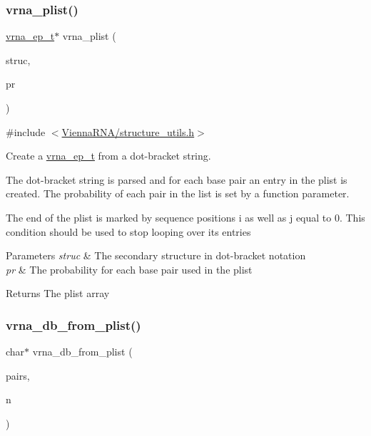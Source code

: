 \subsubsection{\texorpdfstring{vrna\+\_\+plist()}{vrna\_plist()}}
{\footnotesize\ttfamily \mbox{\hyperlink{group__struct__utils_gab9ac98ab55ded9fb90043b024b915aca}{vrna\+\_\+ep\+\_\+t}}$\ast$ vrna\+\_\+plist (\begin{DoxyParamCaption}\item[{const char $\ast$}]{struc,  }\item[{float}]{pr }\end{DoxyParamCaption})}



{\ttfamily \#include $<$\mbox{\hyperlink{structure__utils_8h}{Vienna\+R\+N\+A/structure\+\_\+utils.\+h}}$>$}



Create a \mbox{\hyperlink{group__struct__utils_gab9ac98ab55ded9fb90043b024b915aca}{vrna\+\_\+ep\+\_\+t}} from a dot-\/bracket string. 

The dot-\/bracket string is parsed and for each base pair an entry in the plist is created. The probability of each pair in the list is set by a function parameter.

The end of the plist is marked by sequence positions i as well as j equal to 0. This condition should be used to stop looping over its entries


\begin{DoxyParams}{Parameters}
{\em struc} & The secondary structure in dot-\/bracket notation \\
\hline
{\em pr} & The probability for each base pair used in the plist \\
\hline
\end{DoxyParams}
\begin{DoxyReturn}{Returns}
The plist array 
\end{DoxyReturn}
\mbox{\label{group__struct__utils_ga6a51a36b9245d0bac868c5cd172b9611}} 
\subsubsection{\texorpdfstring{vrna\+\_\+db\+\_\+from\+\_\+plist()}{vrna\_db\_from\_plist()}}
{\footnotesize\ttfamily char$\ast$ vrna\+\_\+db\+\_\+from\+\_\+plist (\begin{DoxyParamCaption}\item[{\mbox{\hyperlink{group__struct__utils_gab9ac98ab55ded9fb90043b024b915aca}{vrna\+\_\+ep\+\_\+t}} $\ast$}]{pairs,  }\item[{unsigned int}]{n }\end{DoxyParamCaption})}



